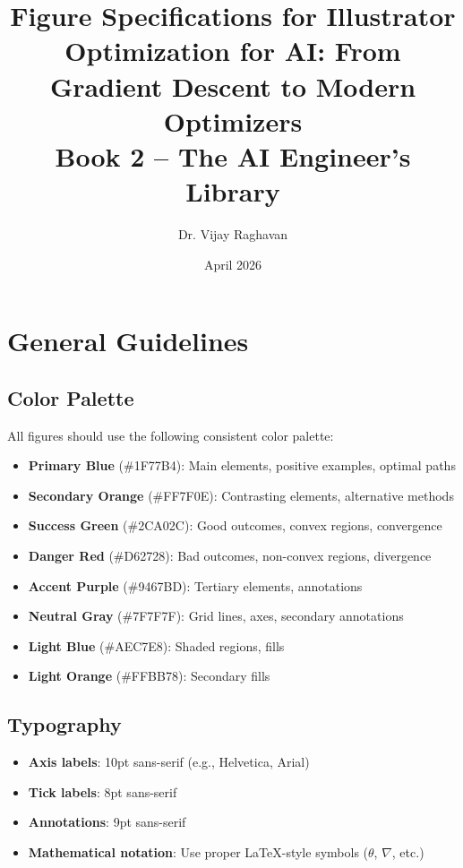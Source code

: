 \documentclass[12pt]{article}
\title{Figure Specifications for Illustrator\\[0.5em]
\large Optimization for AI: From Gradient Descent to Modern Optimizers\\
Book 2 -- The AI Engineer's Library}
\author{Dr. Vijay Raghavan}
\date{April 2026}
\begin{document}
\maketitle

\tableofcontents
\newpage

\section{General Guidelines}

\subsection{Color Palette}
All figures should use the following consistent color palette:
\begin{itemize}
    \item \textbf{Primary Blue} (\#1F77B4): Main elements, positive examples, optimal paths
    \item \textbf{Secondary Orange} (\#FF7F0E): Contrasting elements, alternative methods
    \item \textbf{Success Green} (\#2CA02C): Good outcomes, convex regions, convergence
    \item \textbf{Danger Red} (\#D62728): Bad outcomes, non-convex regions, divergence
    \item \textbf{Accent Purple} (\#9467BD): Tertiary elements, annotations
    \item \textbf{Neutral Gray} (\#7F7F7F): Grid lines, axes, secondary annotations
    \item \textbf{Light Blue} (\#AEC7E8): Shaded regions, fills
    \item \textbf{Light Orange} (\#FFBB78): Secondary fills
\end{itemize}

\subsection{Typography}
\begin{itemize}
    \item \textbf{Axis labels}: 10pt sans-serif (e.g., Helvetica, Arial)
    \item \textbf{Tick labels}: 8pt sans-serif
    \item \textbf{Annotations}: 9pt sans-serif
    \item \textbf{Mathematical notation}: Use proper LaTeX-style symbols ($\theta$, $\nabla$, etc.)
\end{itemize}
\end{document}
